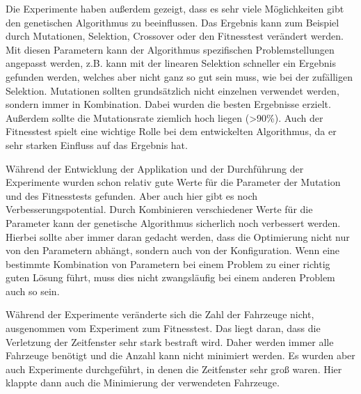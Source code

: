 Die Experimente haben außerdem gezeigt, dass es sehr viele Möglichkeiten gibt den genetischen Algorithmus zu beeinflussen. Das Ergebnis kann zum Beispiel durch Mutationen, Selektion, Crossover oder den Fitnesstest verändert werden. Mit diesen Parametern kann der Algorithmus spezifischen Problemstellungen angepasst werden, z.B. kann mit der linearen Selektion schneller ein Ergebnis gefunden werden, welches aber nicht ganz so gut sein muss, wie bei der zufälligen Selektion. Mutationen sollten grundsätzlich nicht einzelnen verwendet werden, sondern immer in Kombination. Dabei wurden die besten Ergebnisse erzielt. Außerdem sollte die Mutationsrate ziemlich hoch liegen (\textgreater 90\%). Auch der Fitnesstest spielt eine wichtige Rolle bei dem entwickelten Algorithmus, da er sehr starken Einfluss auf das Ergebnis hat.

Während der Entwicklung der Applikation und der Durchführung der Experimente wurden schon relativ gute Werte für die Parameter der Mutation und des Fitnesstests gefunden. Aber auch hier gibt es noch Verbesserungspotential. Durch Kombinieren verschiedener Werte für die Parameter kann der genetische Algorithmus sicherlich noch verbessert werden. Hierbei sollte aber immer daran gedacht werden, dass die Optimierung nicht nur von den Parametern abhängt, sondern auch von der Konfiguration. Wenn eine bestimmte Kombination von Parametern bei einem Problem zu einer richtig guten Lösung führt, muss dies nicht zwangsläufig bei einem anderen Problem auch so sein.

Während der Experimente veränderte sich die Zahl der Fahrzeuge nicht, ausgenommen vom Experiment zum Fitnesstest. Das liegt daran, dass die Verletzung der Zeitfenster sehr stark bestraft wird. Daher werden immer alle Fahrzeuge benötigt und die Anzahl kann nicht minimiert werden. Es wurden aber auch Experimente durchgeführt, in denen die Zeitfenster sehr groß waren. Hier klappte dann auch die Minimierung der verwendeten Fahrzeuge.
